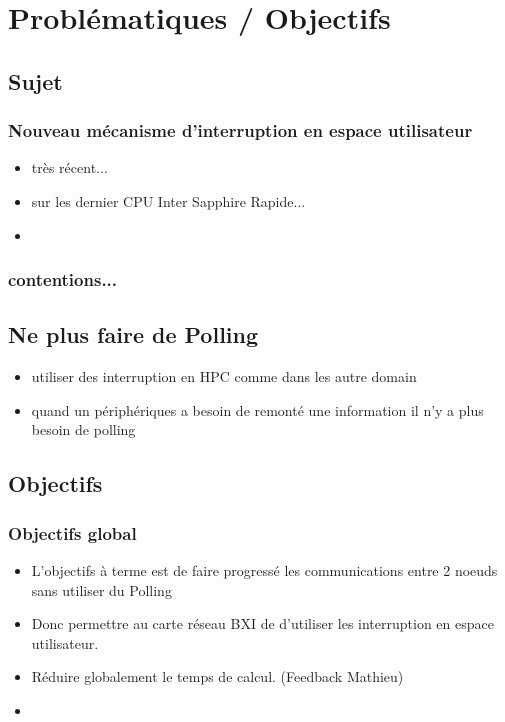 \section{Problématiques / Objectifs} %

\subsection{Sujet}

\subsubsection{Nouveau mécanisme d'interruption en espace utilisateur}

\begin{itemize}
  \item très récent...
  \item sur les dernier CPU Inter Sapphire Rapide...
  \item 
\end{itemize}

\subsubsection{contentions...}

\subsection{Ne plus faire de Polling}

\begin{itemize}
  \item utiliser des interruption en HPC comme dans les autre domain
  \item quand un périphériques a besoin de remonté une information il n'y a plus besoin de polling
\end{itemize}

\subsection{Objectifs}

\subsubsection{Objectifs global}

\begin{itemize}
  \item L'objectifs à terme est de faire progressé les communications entre 2 noeuds sans utiliser du Polling
  \item Donc permettre au carte réseau BXI de d'utiliser les interruption en espace utilisateur.
  \item Réduire globalement le temps de calcul. (Feedback Mathieu)
  \item 
\end{itemize}

